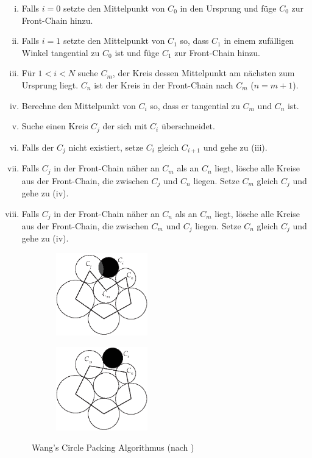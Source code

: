 \begin{enumerate}[(i), labelindent=0pt, align=left, itemsep=0pt, parsep=0pt, labelsep=.5em, leftmargin=!]
  \item Falls $i = 0$ setzte den Mittelpunkt von $C_0$ in den Ursprung und füge $C_0$ zur Front-Chain hinzu.
  \item Falls $i = 1$ setzte den Mittelpunkt von $C_1$ so, dass $C_1$ in einem zufälligen Winkel tangential zu $C_0$ ist und füge $C_1$ zur Front-Chain hinzu.
  \item Für $1 < i < N$ suche $C_m$, der Kreis dessen Mittelpunkt am nächsten zum Ursprung liegt. $C_n$ ist der Kreis in der Front-Chain nach $C_m$ ($n=m+1$).
  \item Berechne den Mittelpunkt von $C_i$ so, dass er tangential zu $C_m$ und $C_n$ ist.
  \item Suche einen Kreis $C_j$ der sich mit $C_i$ überschneidet.
  \item Falls der $C_j$ nicht existiert, setze $C_i$ gleich $C_{i+1}$ und gehe zu (iii).
  \item Falls $C_j$ in der Front-Chain näher an $C_m$ als an $C_n$ liegt, lösche alle Kreise aus der Front-Chain, die zwischen $C_j$ und $C_n$ liegen. Setze $C_m$ gleich $C_j$ und gehe zu (iv).
  \item Falls $C_j$ in der Front-Chain näher an $C_n$ als an $C_m$ liegt, lösche alle Kreise aus der Front-Chain, die zwischen $C_m$ und $C_j$ liegen. Setze $C_n$ gleich $C_j$ und gehe zu (iv).
\end{enumerate}

\label{subsec:collision}\setlength{\fwidth}{.4\textwidth}
\begin{figure}[htb]
  \captionsetup{justification=centering}
  \begin{subfigure}[t]{\fwidth}
   \includegraphics[width=150px]{figures/add-circle}
    \label{fig:add-circle}
  \end{subfigure}
  \hspace{1cm}
  \begin{subfigure}[t]{\fwidth}
  	\includegraphics[width=150px]{figures/update-frontchain}
  	 \label{fig:update-frontchain}
  \end{subfigure}
  \caption{Wang's Circle Packing Algorithmus (nach \cite{bostock2017abetter})}
  \label{fig:circle-packing}
\end{figure}


